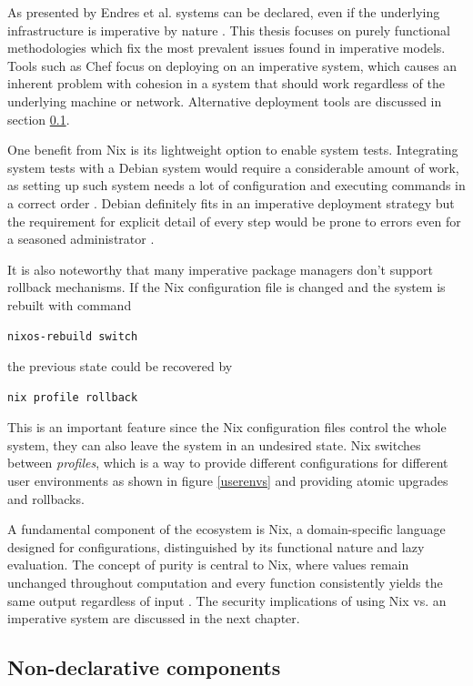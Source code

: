 As presented by Endres et al. systems can be declared, even if the
underlying infrastructure is imperative by nature
\cite{endres2017declarative}. This thesis focuses on purely functional
methodologies which fix the most prevalent issues found in
imperative models. Tools such as Chef focus on deploying on an
imperative system, which causes an inherent problem with cohesion in a
system that should work regardless of the underlying machine or
network. Alternative deployment tools are discussed in section
\ref{nondeclarative}.

One benefit from Nix is its lightweight option to enable system
tests. Integrating system tests with a Debian system would require a
considerable amount of work, as setting up such system needs a lot of
configuration and executing commands in a correct order
\cite{van2010automating}. Debian definitely fits in an imperative
deployment strategy but the requirement for explicit detail of every
step would be prone to errors even for a seasoned administrator
\cite{breitenbucher2017declarative}.

It is also noteworthy that many imperative package managers don't
support rollback mechanisms. If the Nix configuration file is changed
and the system is rebuilt with command
\begin{lstlisting}
nixos-rebuild switch
\end{lstlisting}
the previous state could be recovered by
\begin{lstlisting}
nix profile rollback
\end{lstlisting}
This is an important feature since the Nix configuration files control
the whole system, they can also leave the system in an undesired
state. Nix switches between \textit{profiles}, which is a way to
provide different configurations for different user environments as
shown in figure \ref{userenvs} and providing atomic upgrades and
rollbacks. \cite{nixosNixOSManual}

A fundamental component of the ecosystem is Nix, a domain-specific
language designed for configurations, distinguished by its functional
nature and lazy evaluation. The concept of purity is central to Nix,
where values remain unchanged throughout computation and every
function consistently yields the same output regardless of input
\cite{dolstra2013charon}. The security implications of using Nix
vs. an imperative system are discussed in the next chapter.

\subsection{Non-declarative components} \label{nondeclarative}

